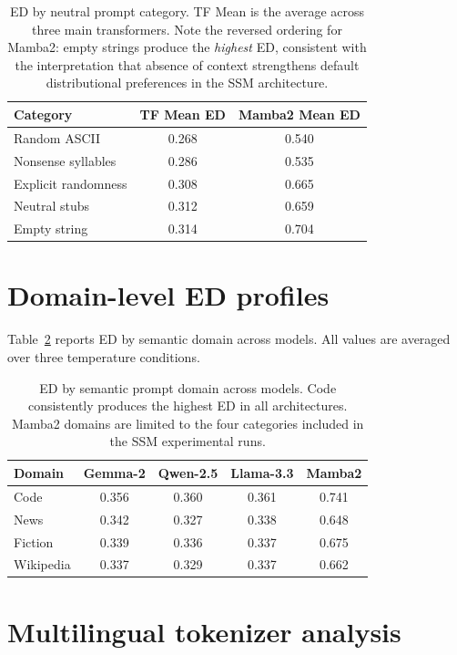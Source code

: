 \documentclass{article}
\begin{document}
\begin{table}[H]
\centering
\small
\begin{tabular}{lcc}
\toprule
\textbf{Category} & \textbf{TF Mean ED} & \textbf{Mamba2 Mean ED} \\
\midrule
Random ASCII & 0.268 & 0.540 \\
Nonsense syllables & 0.286 & 0.535 \\
Explicit randomness & 0.308 & 0.665 \\
Neutral stubs & 0.312 & 0.659 \\
Empty string & 0.314 & 0.704 \\
\bottomrule
\end{tabular}
\caption{ED by neutral prompt category. TF Mean is the average across three main transformers. Note the reversed ordering for Mamba2: empty strings produce the \emph{highest} ED, consistent with the interpretation that absence of context strengthens default distributional preferences in the SSM architecture.}
\label{tab:neutral}
\end{table}

\section{Domain-level ED profiles}
\label{app:domains}

Table~\ref{tab:domains} reports ED by semantic domain across models. All values are averaged over three temperature conditions.

\begin{table}[H]
\centering
\small
\begin{tabular}{lcccc}
\toprule
\textbf{Domain} & \textbf{Gemma-2} & \textbf{Qwen-2.5} & \textbf{Llama-3.3} & \textbf{Mamba2} \\
\midrule
Code & 0.356 & 0.360 & 0.361 & 0.741 \\
News & 0.342 & 0.327 & 0.338 & 0.648 \\
Fiction & 0.339 & 0.336 & 0.337 & 0.675 \\
Wikipedia & 0.337 & 0.329 & 0.337 & 0.662 \\
\bottomrule
\end{tabular}
\caption{ED by semantic prompt domain across models. Code consistently produces the highest ED in all architectures. Mamba2 domains are limited to the four categories included in the SSM experimental runs.}
\label{tab:domains}
\end{table}

\section{Multilingual tokenizer analysis}
\label{app:tokenizer}
\end{document}
